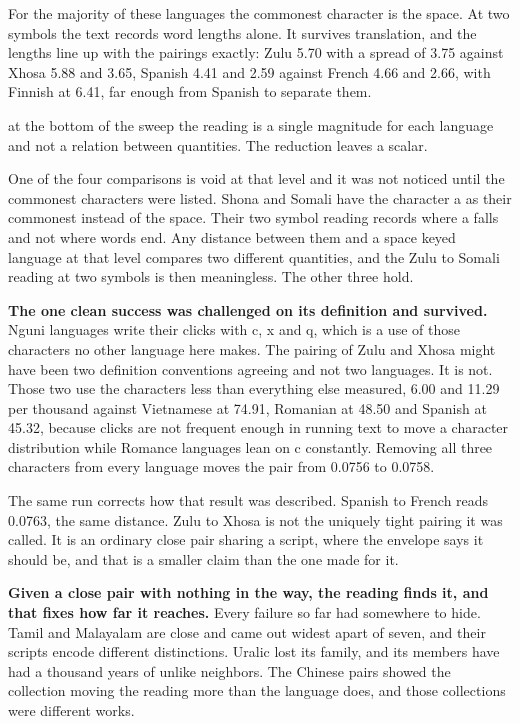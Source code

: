 For the majority of these languages the commonest character is the space. At two symbols the text records word lengths alone. It survives translation, and the lengths line up with the pairings exactly: Zulu 5.70 with a spread of 3.75 against Xhosa 5.88 and 3.65, Spanish 4.41 and 2.59 against French 4.66 and 2.66, with Finnish at 6.41, far enough from Spanish to separate them.

at the bottom of the sweep the reading is a single magnitude for each language and not a relation between quantities. The reduction leaves a scalar.

One of the four comparisons is void at that level and it was not noticed until the commonest characters were listed. Shona and Somali have the character a as their commonest instead of the space. Their two symbol reading records where a falls and not where words end. Any distance between them and a space keyed language at that level compares two different quantities, and the Zulu to Somali reading at two symbols is then meaningless. The other three hold.

\textbf{The one clean success was challenged on its definition and survived.} Nguni languages write their clicks with c, x and q, which is a use of those characters no other language here makes. The pairing of Zulu and Xhosa might have been two definition conventions agreeing and not two languages. It is not. Those two use the characters less than everything else measured, 6.00 and 11.29 per thousand against Vietnamese at 74.91, Romanian at 48.50 and Spanish at 45.32, because clicks are not frequent enough in running text to move a character distribution while Romance languages lean on c constantly. Removing all three characters from every language moves the pair from 0.0756 to 0.0758.

The same run corrects how that result was described. Spanish to French reads 0.0763, the same distance. Zulu to Xhosa is not the uniquely tight pairing it was called. It is an ordinary close pair sharing a script, where the envelope says it should be, and that is a smaller claim than the one made for it.

\textbf{Given a close pair with nothing in the way, the reading finds it, and that fixes how far it reaches.} Every failure so far had somewhere to hide. Tamil and Malayalam are close and came out widest apart of seven, and their scripts encode different distinctions. Uralic lost its family, and its members have had a thousand years of unlike neighbors. The Chinese pairs showed the collection moving the reading more than the language does, and those collections were different works.

